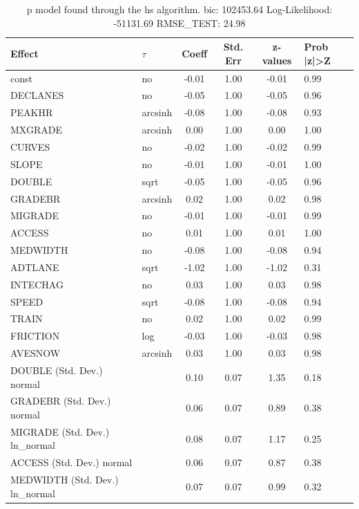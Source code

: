 \begin{table}
	\caption{p model found through the hs algorithm. bic: 102453.64 Log-Likelihood: -51131.69 RMSE_TEST: 24.98}
	\begin{center}
		\begin{tabular}{|l|l|c|c|c|l|}
			\hline
			Effect & $\tau$ & Coeff & Std. Err & z-values & Prob |z|>Z \\
			\hline
			const & no & -0.01 & 1.00 & -0.01 & 0.99 \\
			\hline
			DECLANES & no & -0.05 & 1.00 & -0.05 & 0.96 \\
			\hline
			PEAKHR & arcsinh & -0.08 & 1.00 & -0.08 & 0.93 \\
			\hline
			MXGRADE & arcsinh & 0.00 & 1.00 & 0.00 & 1.00 \\
			\hline
			CURVES & no & -0.02 & 1.00 & -0.02 & 0.99 \\
			\hline
			SLOPE & no & -0.01 & 1.00 & -0.01 & 1.00 \\
			\hline
			DOUBLE & sqrt & -0.05 & 1.00 & -0.05 & 0.96 \\
			\hline
			GRADEBR & arcsinh & 0.02 & 1.00 & 0.02 & 0.98 \\
			\hline
			MIGRADE & no & -0.01 & 1.00 & -0.01 & 0.99 \\
			\hline
			ACCESS & no & 0.01 & 1.00 & 0.01 & 1.00 \\
			\hline
			MEDWIDTH & no & -0.08 & 1.00 & -0.08 & 0.94 \\
			\hline
			ADTLANE & sqrt & -1.02 & 1.00 & -1.02 & 0.31 \\
			\hline
			INTECHAG & no & 0.03 & 1.00 & 0.03 & 0.98 \\
			\hline
			SPEED & sqrt & -0.08 & 1.00 & -0.08 & 0.94 \\
			\hline
			TRAIN & no & 0.02 & 1.00 & 0.02 & 0.99 \\
			\hline
			FRICTION & log & -0.03 & 1.00 & -0.03 & 0.98 \\
			\hline
			AVESNOW & arcsinh & 0.03 & 1.00 & 0.03 & 0.98 \\
			\hline
			DOUBLE (Std. Dev.) normal &  & 0.10 & 0.07 & 1.35 & 0.18 \\
			\hline
			GRADEBR (Std. Dev.) normal &  & 0.06 & 0.07 & 0.89 & 0.38 \\
			\hline
			MIGRADE (Std. Dev.) ln_normal &  & 0.08 & 0.07 & 1.17 & 0.25 \\
			\hline
			ACCESS (Std. Dev.) normal &  & 0.06 & 0.07 & 0.87 & 0.38 \\
			\hline
			MEDWIDTH (Std. Dev.) ln_normal &  & 0.07 & 0.07 & 0.99 & 0.32 \\

\end{tabular}
\end{center}
\end{table}

